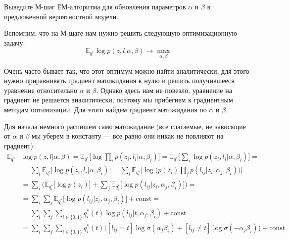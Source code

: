 \documentclass[12pt,a4paper]{article}
\begin{document}
\begin{vkProblem}
    Выведите М-шаг ЕМ-алгоритма для обновления параметров $\alpha$ и $\beta$ в предложенной вероятностной модели.
\end{vkProblem}

\begin{esSolution}
    \par Вспомним, что на М-шаге нам нужно решить следующую оптимизационную задачу:
    \begin{equation*}
        \mathbb{E}_{q^*} \log p(z, l | \alpha, \beta) \rightarrow \displaystyle\max_{\alpha, \beta}
    \end{equation*}
    
    Очень часто бывает так, что этот оптимум можно найти аналитически, для этого нужно приравнивять градиент матожидания к нулю и решить получившееся уравнение относительно $\alpha$ и $\beta$. Однако здесь нам не повезло, уравнение на градиент не решается аналитически, поэтому мы прибегнем к градиентным методам оптимизации. Для этого найдем градиент матожидания по $\alpha$ и $\beta$.
    
    \par Для начала немного распишем само матожидание (все слагаемые, не зависящие от $\alpha$ и $\beta$ мы уберем в константу --- все равно они никак не повлияют на градиент):
    \begin{align*}
        \mathbb{E}_{q^*} &\log p(z, l | \alpha, \beta) = \mathbb{E}_{q^*} \bigg[ \log \prod_i p(z_i, l_i | \alpha, \beta_i) \bigg] = \mathbb{E}_{q^*} \bigg[ \sum_i \log p(z_i, l_i | \alpha, \beta_i) \bigg] = \\
        &= \sum_i \mathbb{E}_{q_i^*} \Big[ \log p(z_i, l_i | \alpha, \beta_i) \Big] = \sum_i \mathbb{E}_{q_i^*} \bigg[ \log \Big(p(z_i) \prod_j p(l_{ij} | z_i, \alpha_j, \beta_i) \Big) \bigg] = \\
        &= \sum_i \bigg(\mathbb{E}_{q_i^*} \Big[\log p(z_i)\Big] + \sum_j \mathbb{E}_{q_i^*} \Big[ \log p(l_{ij} | z_i, \alpha_j, \beta_i) \Big] \bigg) = \\
        &= \sum_i \sum_j \mathbb{E}_{q_i^*} \Big[ \log p(l_{ij} | z_i, \alpha_j, \beta_i) \Big] + \text{const} = \\
        &= \sum_i \sum_j \sum_{t \in \{0, 1\}} q_i^*(t) \log p(l_{ij} | t, \alpha_j, \beta_i) + \text{const} = \\
        &= \sum_i \sum_j \sum_{t \in \{0, 1\}} q_i^*(t) \Big([l_{ij} = t]\log \sigma (\alpha_j \beta_i) + [l_{ij} \ne t]\log \sigma(-\alpha_j \beta_i) \Big) + \text{const}
    \end{align*}
    

\end{esSolution}
\end{document}

